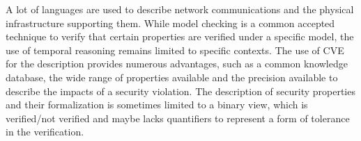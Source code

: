 A lot of languages are used to describe network communications and the physical infrastructure supporting them. While model checking is a common accepted technique to verify that certain properties are verified under a specific model, the use of temporal reasoning remains limited to specific contexts.
The use of CVE for the description provides numerous advantages, such as a common knowledge database, the wide range of properties available and the precision available to describe the impacts of a security violation.
The description of security properties and their formalization is sometimes limited to a binary view, which is verified/not verified and maybe lacks quantifiers to represent a form of tolerance in the verification.